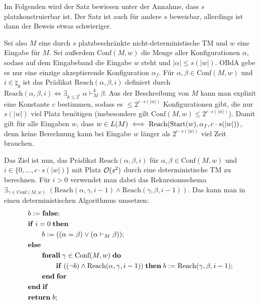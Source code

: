 \begin{Beweis}
    Im Folgenden wird der Satz bewiesen unter der Annahme, dass $s$ platzkonstruierbar ist.
    Der Satz ist auch für andere $s$ beweisbar, allerdings ist dann der Beweis etwas schwieriger.

    Sei also $M$ eine durch $s$ platzbeschränkte nicht-deterministische TM und $w$ eine Eingabe
    für $M$.
    Sei außerdem $\text{Conf}(M, w)$ die Menge aller Konfigurationen $\alpha$, sodass
    auf dem Eingabeband die Eingabe $w$ steht und $|\alpha| \le s(|w|)$.
    OBdA gebe es nur eine einzige akzeptierende Konfiguration $\alpha_f$.
    Für $\alpha, \beta \in \text{Conf}(M, w)$ und $i \in \natural_0$ ist das Prädikat
    $\text{Reach}(\alpha, \beta, i)$ definiert durch
    $\text{Reach}(\alpha, \beta, i) \iff \exists_{k \le 2^i}\; \alpha \vdash_M^k \beta$.
    Aus der Beschreibung von $M$ kann man explizit eine Konstante $c$ bestimmen, sodass
    es $\le 2^{c \cdot s(|w|)}$ Konfigurationen gibt, die nur $s(|w|)$ viel Platz benötigen
    (insbesondere gilt $\text{Conf}(M, w) \le 2^{c \cdot s(|w|)}$).
    Damit gilt für alle Eingaben $w$, dass
    $w \in L(M) \iff \text{Reach}(\text{Start}(w), \alpha_f, c \cdot s(|w|))$, denn
    keine Berechnung kann bei Eingabe $w$ länger als $2^{c \cdot s(|w|)}$ viel Zeit brauchen.

    Das Ziel ist nun, das Prädikat $\text{Reach}(\alpha, \beta, i)$ für
    $\alpha, \beta \in \text{Conf}(M, w)$ und $i \in \{0, \dotsc, c \cdot s(|w|)\}$ mit
    Platz $\mathcal{O}(s^2)$ durch eine deterministische TM zu berechnen.
    Für $i > 0$ verwendet man dabei das Rekursionsschema
    $\exists_{\gamma \in \text{Conf}(M, w)}\; (\text{Reach}(\alpha, \gamma, i - 1) \land
    \text{Reach}(\gamma, \beta, i - 1))$.
    Das kann man in einen deterministischen Algorithmus umsetzen:
    \begin{align*}&
        b := \mathbf{false};\\&
        \mathbf{if}\; i = 0 \;\mathbf{then}\;\\&
        \qquad b := ((\alpha = \beta) \lor (\alpha \vdash_M \beta));\\&
        \mathbf{else}\;\\&
        \qquad \mathbf{forall}\; \gamma \in \text{Conf}(M, w) \;\mathbf{do}\;\\&
        \qquad \qquad \mathbf{if}\; ((\lnot b) \land \text{Reach}(\alpha, \gamma, i - 1)) \;\mathbf{then}\;
        b := \text{Reach}(\gamma, \beta, i - 1);\\&
        \qquad \mathbf{end}\;\mathbf{for}\;\\&
        \mathbf{end}\;\mathbf{if}\;\\&
        \mathbf{return}\; b;
    \end{align*}


\end{Beweis}
